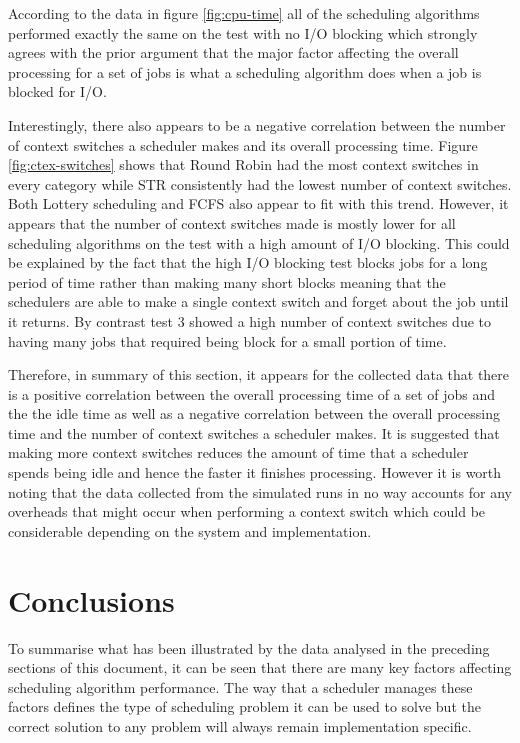 \documentclass{acm_proc_article-sp}
\begin{document}
According to the data in figure \ref{fig:cpu-time} all of the scheduling algorithms performed exactly the same on the test with no I/O blocking which strongly agrees with the prior argument that the major factor affecting the overall processing for a set of jobs is what a scheduling algorithm does when a job is blocked for I/O.

Interestingly, there also appears to be a negative correlation between the number of context switches a scheduler makes and its overall processing time. Figure \ref{fig:ctex-switches} shows that Round Robin had the most context switches in every category while STR consistently had the lowest number of context switches. Both Lottery scheduling and FCFS also appear to fit with this trend. However, it appears that the number of context switches made is mostly lower for all scheduling algorithms on the test with a high amount of I/O blocking. This could be explained by the fact that the high I/O blocking test blocks jobs for a long period of time rather than making many short blocks meaning that the schedulers are able to make a single context switch and forget about the job until it returns. By contrast test 3 showed a high number of context switches due to having many jobs that required being block for a small portion of time.

Therefore, in summary of this section, it appears for the collected data that there is a positive correlation between the overall processing time of a set of jobs and the the idle time as well as a negative correlation between the overall processing time and the number of context switches a scheduler makes. It is suggested that making more context switches reduces the amount of time that a scheduler spends being idle and hence the faster it finishes processing. However it is worth noting that the data collected from the simulated runs in no way accounts for any overheads that might occur when performing a context switch which could be considerable depending on the system and implementation.

\section{Conclusions}
To summarise what has been illustrated by the data analysed in the preceding sections of this document, it can be seen that there are many key factors affecting scheduling algorithm performance. The way that a scheduler manages these factors defines the type of scheduling problem it can be used to solve but the correct solution to any problem will always remain implementation specific.
\end{document}
